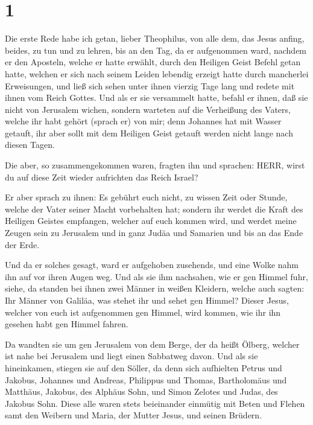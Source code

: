 \hypertarget{section}{%
\section{1}\label{section}}

 Die erste Rede habe ich getan, lieber Theophilus, von alle
dem, das Jesus anfing, beides, zu tun und zu lehren,  bis an
den Tag, da er aufgenommen ward, nachdem er den Aposteln, welche er
hatte erwählt, durch den Heiligen Geist Befehl getan hatte, 
welchen er sich nach seinem Leiden lebendig erzeigt hatte durch
mancherlei Erweisungen, und ließ sich sehen unter ihnen vierzig Tage
lang und redete mit ihnen vom Reich Gottes.  Und als er sie
versammelt hatte, befahl er ihnen, daß sie nicht von Jerusalem wichen,
sondern warteten auf die Verheißung des Vaters, welche ihr habt gehört
(sprach er) von mir;  denn Johannes hat mit Wasser getauft,
ihr aber sollt mit dem Heiligen Geist getauft werden nicht lange nach
diesen Tagen.

 Die aber, so zusammengekommen waren, fragten ihn und
sprachen: HERR, wirst du auf diese Zeit wieder aufrichten das Reich
Israel?

 Er aber sprach zu ihnen: Es gebührt euch nicht, zu wissen
Zeit oder Stunde, welche der Vater seiner Macht vorbehalten hat;
 sondern ihr werdet die Kraft des Heiligen Geistes
empfangen, welcher auf euch kommen wird, und werdet meine Zeugen sein zu
Jerusalem und in ganz Judäa und Samarien und bis an das Ende der Erde.

 Und da er solches gesagt, ward er aufgehoben zusehends, und
eine Wolke nahm ihn auf vor ihren Augen weg.  Und als sie
ihm nachsahen, wie er gen Himmel fuhr, siehe, da standen bei ihnen zwei
Männer in weißen Kleidern,  welche auch sagten: Ihr Männer
von Galiläa, was stehet ihr und sehet gen Himmel? Dieser Jesus, welcher
von euch ist aufgenommen gen Himmel, wird kommen, wie ihr ihn gesehen
habt gen Himmel fahren.

 Da wandten sie um gen Jerusalem von dem Berge, der da
heißt Ölberg, welcher ist nahe bei Jerusalem und liegt einen Sabbatweg
davon.  Und als sie hineinkamen, stiegen sie auf den
Söller, da denn sich aufhielten Petrus und Jakobus, Johannes und
Andreas, Philippus und Thomas, Bartholomäus und Matthäus, Jakobus, des
Alphäus Sohn, und Simon Zelotes und Judas, des Jakobus Sohn.
 Diese alle waren stets beieinander einmütig mit Beten und
Flehen samt den Weibern und Maria, der Mutter Jesus, und seinen Brüdern.

